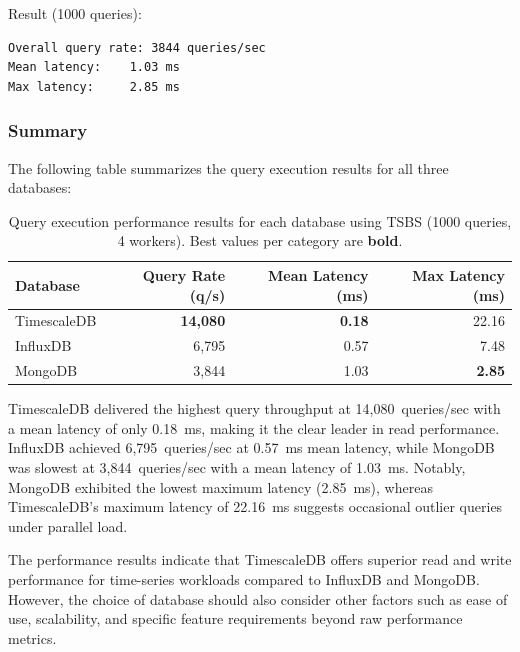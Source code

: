 Result (1000 queries):

\begin{lstlisting}[language=bash, caption={Query execution output for MongoDB.}, label={lst:tsbs-query-mongodb-output}]
Overall query rate: 3844 queries/sec
Mean latency:    1.03 ms
Max latency:     2.85 ms
\end{lstlisting}

\subsubsection{Summary}

The following table summarizes the query execution results for all three
databases:

\begin{table}[ht!]
    \centering
    \begin{tabular}{|l|r|r|r|} %
        \hline %
        \textbf{Database} & \textbf{Query Rate (q/s)} & \textbf{Mean Latency (ms)} & \textbf{Max Latency (ms)} \\
        \hline %
        TimescaleDB       & \textbf{14,080}           & \textbf{0.18}              & 22.16                     \\
        InfluxDB          & 6,795                     & 0.57                       & 7.48                      \\
        MongoDB           & 3,844                     & 1.03                       & \textbf{2.85}             \\
        \hline %
    \end{tabular}
    \caption{Query execution performance results for each database using TSBS (1000 queries, 4 workers). Best values per category are \textbf{bold}.}\label{tab:tsbs-query-results}
\end{table}

TimescaleDB delivered the highest query throughput at 14,080~queries/sec with a
mean latency of only 0.18~ms, making it the clear leader in read performance.
InfluxDB achieved 6,795~queries/sec at 0.57~ms mean latency, while MongoDB was
slowest at 3,844~queries/sec with a mean latency of 1.03~ms. Notably, MongoDB
exhibited the lowest maximum latency (2.85~ms), whereas TimescaleDB's maximum
latency of 22.16~ms suggests occasional outlier queries under parallel load.

The performance results indicate that TimescaleDB offers superior read and
write performance for time-series workloads compared to InfluxDB and MongoDB\@.
However, the choice of database should also consider other factors such as ease
of use, scalability, and specific feature requirements beyond raw performance
metrics.

